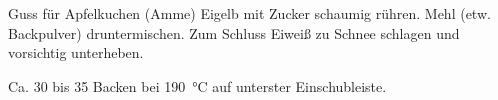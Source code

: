 \begin{MyRecipe}{Guss für Apfelkuchen (Amme)}{}{}
	Eigelb mit Zucker schaumig rühren. Mehl (etw. Backpulver) druntermischen. Zum Schluss Eiweiß zu Schnee schlagen und vorsichtig unterheben.\par\bigskip
	
	Ca. \SI{30}{\minuteprime} bis \SI{35}{\minuteprime} Backen bei \SI{190}{\degreeCelsius} auf unterster Einschubleiste.
	
\end{MyRecipe}